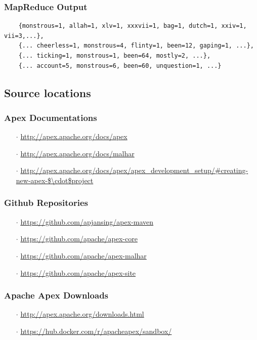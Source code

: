 \documentclass[final]{IEEEtran}
\begin{document}
\subsubsection{MapReduce Output}\label{sec:map-reduce-output}
  \begin{lstlisting}
    {monstrous=1, allah=1, xlv=1, xxxvii=1, bag=1, dutch=1, xxiv=1, vii=3,...},
    {... cheerless=1, monstrous=4, flinty=1, been=12, gaping=1, ...},
    {... ticking=1, monstrous=1, been=64, mostly=2, ...},
    {... account=5, monstrous=6, been=60, unquestion=1, ...}
  \end{lstlisting}


\subsection{Source locations}

\subsubsection{Apex Documentations}\label{sec:apex-docs}
\begin{enumerate}
  \item[$\cdot$] \url{http://apex.apache.org/docs/apex}
  \item[$\cdot$] \url{http://apex.apache.org/docs/malhar}
  \item[$\cdot$] \url{http://apex.apache.org/docs/apex/apex_development_setup/#creating-new-apex-$\cdot$project}
\end{enumerate}

\subsubsection{Github Repositories}\label{sec:repos}
\begin{enumerate}
  \item[$\cdot$] \url{https://github.com/apjansing/apex-maven}
	\item[$\cdot$] \url{https://github.com/apache/apex-core}
	\item[$\cdot$] \url{https://github.com/apache/apex-malhar}
	\item[$\cdot$] \url{https://github.com/apache/apex-site}
\end{enumerate} 

\subsubsection{Apache Apex Downloads}\label{sec:apex-downloads}
\begin{enumerate}
	\item[$\cdot$] \url{http://apex.apache.org/downloads.html}
	\item[$\cdot$] \url{https://hub.docker.com/r/apacheapex/sandbox/}
\end{enumerate}
\end{document}
